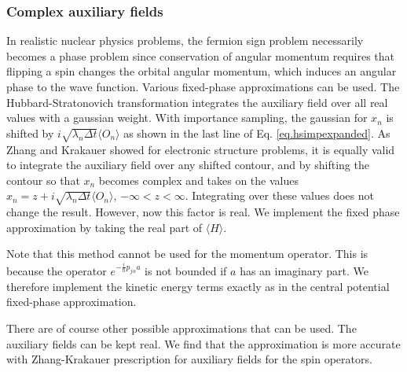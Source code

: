 \subsubsection{Complex auxiliary fields}
In realistic nuclear physics problems,
the fermion sign problem necessarily becomes a phase problem
since conservation of angular momentum requires that flipping a spin changes
the orbital angular momentum, which induces an angular phase to the wave
function. Various fixed-phase approximations can be used. The
Hubbard-Stratonovich transformation integrates the auxiliary field over
all real values with a gaussian weight. With importance sampling, the
gaussian for $x_n$ is shifted by $i\sqrt{\lambda_n \Delta t}\langle O_n\rangle$
as shown in the last line of Eq. \ref{eq.hsimpexpanded}.
As Zhang and Krakauer\cite{zhang2003} showed for electronic structure problems,
it is equally valid to integrate the auxiliary field over any shifted
contour, and by shifting the contour so that $x_n$ becomes complex
and takes on the values
$x_n  = z + i\sqrt{\lambda_n \Delta t}\langle O_n\rangle$,
$-\infty < z < \infty$. Integrating over these values does not change the
result. However, now this factor is real. We implement the fixed phase
approximation by taking the real part of $\langle H \rangle$.


Note that this method cannot be used for the momentum operator. This is
because the operator
$e^{-\frac{i}{\hbar} p_{j\alpha} a}$ is not bounded if $a$ has an imaginary
part. We therefore implement the kinetic energy terms exactly as in the
central potential fixed-phase approximation.

There are of course other possible approximations that can be used. The
auxiliary fields can be kept real. We find that the approximation is
more accurate with Zhang-Krakauer prescription for auxiliary fields for
the spin operators.

